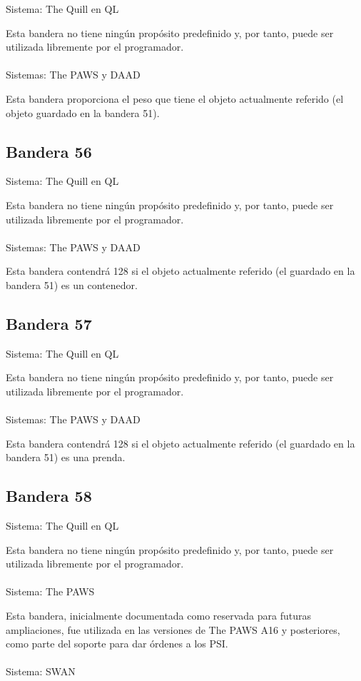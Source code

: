 \documentclass[11pt, a5paper]{article}
\newcommand{\quill}{\textsf{The Quill}\xspace}
\newcommand{\paw}{\textsf{The PAWS}\xspace}
\newcommand{\swan}{\textsf{SWAN}\xspace}
\newcommand{\daad}{\textsf{DAAD}\xspace}
\newcommand{\sistema}[1]{\noindent Sistema: #1 \nopagebreak}
\newcommand{\sistemas}[1]{\noindent Sistemas: #1 \nopagebreak}
\begin{document}
\sistema{\quill en QL}

Esta bandera no tiene ningún propósito predefinido y, por tanto, puede ser utilizada libremente por el programador.
\\\ \\
\sistemas{\paw y \daad}

Esta bandera proporciona el peso que tiene el objeto actualmente referido (el objeto guardado en la bandera 51).

\subsection{Bandera 56}

\sistema{\quill en QL}

Esta bandera no tiene ningún propósito predefinido y, por tanto, puede ser utilizada libremente por el programador.
\\\ \\
\sistemas{\paw y \daad}

Esta bandera contendrá 128 si el objeto actualmente referido (el guardado en la bandera 51) es un contenedor.

\subsection{Bandera 57}

\sistema{\quill en QL}

Esta bandera no tiene ningún propósito predefinido y, por tanto, puede ser utilizada libremente por el programador.
\\\ \\
\sistemas{\paw y \daad}

Esta bandera contendrá 128 si el objeto actualmente referido (el guardado en la bandera 51) es una prenda.

\subsection{Bandera 58}

\sistema{\quill en QL}

Esta bandera no tiene ningún propósito predefinido y, por tanto, puede ser utilizada libremente por el programador.
\\\ \\
\sistema{\paw}

Esta bandera, inicialmente documentada como reservada para futuras ampliaciones, fue utilizada en las versiones de \paw A16 y posteriores, como parte del soporte para dar órdenes a los PSI. \cite{PawsSupl}
\\\ \\
\sistema{\swan}
\end{document}

